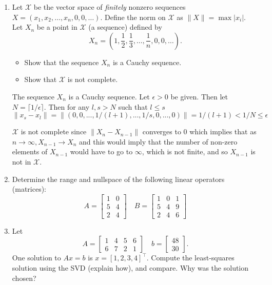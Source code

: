 \documentclass{article}
\begin{document}
\begin{enumerate}
\color{black}

\item
Let $\mathcal X$ be the vector space of \emph{finitely} nonzero sequences $X=(x_1, x_2, \ldots, x_n, 0, 0, \ldots)$.
Define the norm on $\mathcal X$ as $\|X\|=\max |x_i|$.
Let $X_n$ be a point in $\mathcal X$ (a sequence) defined by
$$X_n = \left(1, \frac{1}{2}, \frac{1}{3}, \ldots, \frac{1}{n}, 0, 0, \ldots \right).$$



\begin{itemize}
\item
Show that the sequence $X_n$ is a Cauchy sequence.
\item
Show that $\mathcal X$ is not complete.
\end{itemize}

\color{blue}
The sequence $X_n$ is a Cauchy sequence. Let $\epsilon > 0$ be given. 
Then let $N= \lceil 1/\epsilon \rceil$. Then for any $l,s > N$
such that $l \leq s$
$$
\|x_s - x_l\| = \|(0,0,...,1/(l+1), ..., 1/s,0,...,0)\| = 1/(l+1) < 1/N \leq \epsilon
$$

$\mathcal X$ is not complete since $\|X_n - X_{n-1}\|$ converges to 0 which implies that as $n \to \infty, X_{n-1} \to X_n$ and this would imply that the number of non-zero elements of $X_{n-1}$ would have to go to $\infty$, which is not finite, and so $X_{n-1}$ is not in $\mathcal X$. 
\color{black}

\item
Determine the range and nullspace of the following linear operators (matrices):
$$A=
\begin{bmatrix}
1 & 0 \\
5 & 4 \\
2 & 4
\end{bmatrix}
\quad
B=
\begin{bmatrix}
1 & 0 & 1 \\
5 & 4 & 9 \\
2 & 4 & 6
\end{bmatrix}
$$

\item
Let 
$$A=\begin{bmatrix}
1 & 4 & 5 & 6 \\
6 & 7 & 2 & 1
\end{bmatrix}
\quad
b=\begin{bmatrix}
48\\
30
\end{bmatrix}.$$
One solution to $Ax=b$ is $x=[1,2,3,4]^\top$.  Compute the least-squares solution using the SVD (explain how), and compare. Why was the solution chosen?


\end{enumerate}
\end{document}
